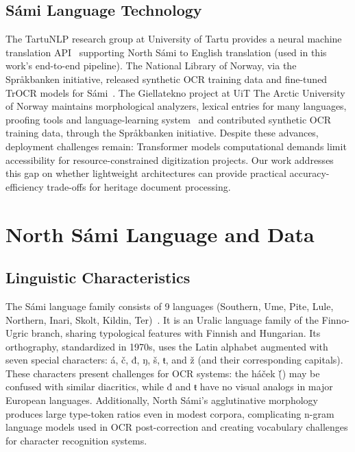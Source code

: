 \documentclass[conference]{IEEEtran}
\begin{document}
\subsection{S\'{a}mi Language Technology}
\label{subsec:sami_tech}

The TartuNLP research group at University of Tartu provides a neural machine translation API~\cite{tartunlp} supporting North S\'{a}mi to English translation (used in this work's end-to-end pipeline). The National Library of Norway, via the Spr\r{a}kbanken initiative, released synthetic OCR training data and fine-tuned TrOCR models for S\'{a}mi~\cite{enstad2025}. The Giellatekno project at UiT The Arctic University of Norway maintains morphological analyzers, lexical entries for many languages, proofing tools and language-learning system~\cite{moshagen2014} and contributed synthetic OCR training data, through the Spr\r{a}kbanken initiative.
Despite these advances, deployment challenges remain: Transformer models computational demands limit accessibility for resource-constrained digitization projects. Our work addresses this gap on whether lightweight architectures can provide practical accuracy-efficiency trade-offs for heritage document processing.
\section{North S\'{a}mi Language and Data}
\label{sec:data}

\subsection{Linguistic Characteristics}
\label{subsec:linguistic}
The S\'{a}mi language family consists of 9 languages (Southern, Ume, Pite, Lule, Northern, Inari, Skolt, Kildin, Ter)~\cite{sammallahti1998}. It is an Uralic language family of the Finno-Ugric branch, sharing typological features with Finnish and Hungarian. 
Its orthography, standardized in 1970s, uses the Latin alphabet augmented with seven special characters: \'{a}, \v{c}, đ, ŋ, \v{s}, ŧ, and \v{z} (and their corresponding capitals). These characters present challenges for OCR systems: the háček (\v{}) may be confused with similar diacritics, while đ and ŧ have no visual analogs in major European languages. Additionally, North S\'{a}mi's agglutinative morphology produces large type-token ratios even in modest corpora, complicating n-gram language models used in OCR post-correction and creating vocabulary challenges for character recognition systems.
\end{document}
